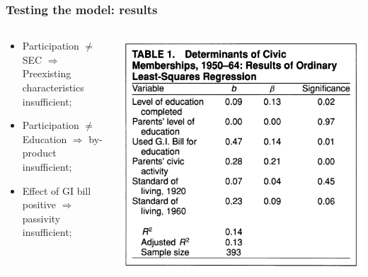 \documentclass[aspectratio=169]{beamer}
\theoremstyle{principle}
\begin{document}
\begin{frame}
\frametitle{Testing the model: results}
\begin{columns}
\begin{column}{0.5\textwidth}
\begin{itemize}
\item Participation $\neq$ SEC $\Rightarrow$ Preexisting characteristics insufficient;
\bigskip
\item Participation $\neq$ Education $\Rightarrow$ by-product insufficient;
\bigskip
\item Effect of GI bill positive $\Rightarrow$ passivity insufficient;
\end{itemize}
\end{column}
\begin{column}{0.5\textwidth}
\begin{center}
\includegraphics[scale=0.4]{table_1.png}
\end{center}
\end{column}
\end{columns}
\end{frame}
\end{document}
